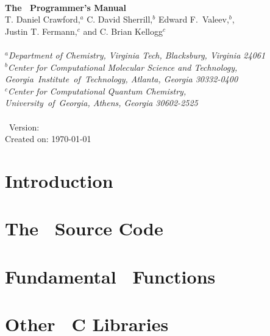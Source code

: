 \documentclass[12pt]{article}
\begin{document}


\initfuncdesc

\begin{center}
\ \\
\vspace{2.0in}
{\bf {\Large The \PSIthree\ Programmer's Manual}} \\
\vspace{0.5in} 
T. Daniel Crawford,$^a$ C. David Sherrill,$^b$ Edward F.\ Valeev,$^b$, \\
Justin T. Fermann,$^c$ and C. Brian Kellogg$^c$ \\ 
\ \\ 
{\em $^a$Department of Chemistry, Virginia Tech, Blacksburg, Virginia 24061} \\
\vspace{0.1in}
{\em $^b$Center for Computational Molecular Science and Technology, \mbox{Georgia 
Institute of Technology,} Atlanta, Georgia 30332-0400} \\
\vspace{0.1in}
{\em $^c$Center for Computational Quantum Chemistry, \\ 
\mbox{University of Georgia,} Athens, Georgia 30602-2525} \\
\ \\
\vspace{0.3in}
\PSIthree\ Version: \PSIversion \\
Created on: \today
\end{center}

\thispagestyle{empty}

\newpage
\tableofcontents

\newpage
\section{Introduction}



\section{The \PSIthree\ Source Code}\label{cvs}


\section{Fundamental \PSIthree\ Functions}\label{Fundamental_PSI}


\section{Other \PSIthree\ C Libraries}\label{Other_Libs}

\end{document}
